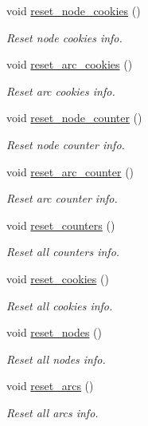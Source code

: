 \begin{DoxyCompactItemize}
void \hyperlink{class_designar_1_1_base_graph_ab797f80e7efa5a6d0b33f925d6079c18}{reset\+\_\+node\+\_\+cookies} ()
\begin{DoxyCompactList}\small\item\em Reset node cookies info. \end{DoxyCompactList}\item 
void \hyperlink{class_designar_1_1_base_graph_a44b6cefb8966ed69a0d80bfe7e4546cb}{reset\+\_\+arc\+\_\+cookies} ()
\begin{DoxyCompactList}\small\item\em Reset arc cookies info. \end{DoxyCompactList}\item 
void \hyperlink{class_designar_1_1_base_graph_a53603f64b51b470cc6b8c8d6d2b643a4}{reset\+\_\+node\+\_\+counter} ()
\begin{DoxyCompactList}\small\item\em Reset node counter info. \end{DoxyCompactList}\item 
void \hyperlink{class_designar_1_1_base_graph_a8b22e29aa37006fab9c219de86660bdd}{reset\+\_\+arc\+\_\+counter} ()
\begin{DoxyCompactList}\small\item\em Reset arc counter info. \end{DoxyCompactList}\item 
void \hyperlink{class_designar_1_1_base_graph_a881c342d8f25d43f995ccfdf876622e1}{reset\+\_\+counters} ()
\begin{DoxyCompactList}\small\item\em Reset all counters info. \end{DoxyCompactList}\item 
void \hyperlink{class_designar_1_1_base_graph_a96a630fd589c34e7e6242f4349606e1c}{reset\+\_\+cookies} ()
\begin{DoxyCompactList}\small\item\em Reset all cookies info. \end{DoxyCompactList}\item 
void \hyperlink{class_designar_1_1_base_graph_a1b21c48fed41f36ad4158d718f837c89}{reset\+\_\+nodes} ()
\begin{DoxyCompactList}\small\item\em Reset all nodes info. \end{DoxyCompactList}\item 
void \hyperlink{class_designar_1_1_base_graph_a6dc66191c2d752bf7f67a4522a7830e3}{reset\+\_\+arcs} ()
\begin{DoxyCompactList}\small\item\em Reset all arcs info. \end{DoxyCompactList}\end{DoxyCompactItemize}
